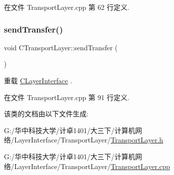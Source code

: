 在文件 Transport\+Layer.\+cpp 第 62 行定义.

\mbox{\label{class_c_transport_layer_a5755c5d7f4158bb08303b98042b24ca1}} 
\subsubsection{\texorpdfstring{send\+Transfer()}{sendTransfer()}}
{\footnotesize\ttfamily void C\+Transport\+Layer\+::send\+Transfer (\begin{DoxyParamCaption}{ }\end{DoxyParamCaption})\hspace{0.3cm}{\ttfamily [virtual]}}



重载 \hyperlink{class_c_layer_interface_a02a144b97e69df2dc47149e5314cba2d}{C\+Layer\+Interface} .



在文件 Transport\+Layer.\+cpp 第 91 行定义.



该类的文档由以下文件生成\+:\begin{DoxyCompactItemize}
\item 
G\+:/华中科技大学/计卓1401/大三下/计算机网络/\+Layer\+Interface/\+Transport\+Layer/\hyperlink{_transport_layer_8h}{Transport\+Layer.\+h}\item 
G\+:/华中科技大学/计卓1401/大三下/计算机网络/\+Layer\+Interface/\+Transport\+Layer/\hyperlink{_transport_layer_8cpp}{Transport\+Layer.\+cpp}\end{DoxyCompactItemize}
